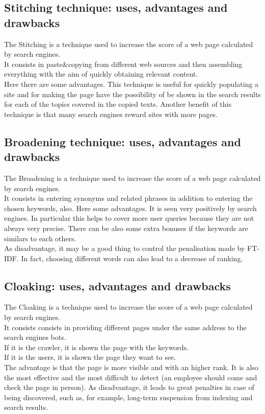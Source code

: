 \subsection{Stitching technique: uses, advantages and drawbacks}
The Stitching is a technique used to increase the score of a web page
calculated by search engines.\\ It consists in paste\&copying from
different web sources and then assembling everything with the aim
of quickly obtaining relevant content.\\
Here there are some advantages. This technique is useful for quickly
populating a site and for making the page have the possibility of be
shown in the search results for each of the topics covered in the copied
texts. Another benefit of this technique is that many search engines
reward sites with more pages.

\subsection{Broadening technique: uses, advantages and drawbacks}
The Broadening is a technique used to increase the score of a web page
calculated by search engines.\\
It consists in entering synonyms and related phrases in addition to
entering the chosen keywords, also.
Here some advantages. It is seen very
positively by search engines.
In particular this helps to cover more user queries because they are
not always very precise. There can be also some extra bonuses if the
keywords are similars to each others.\\
As disadvantage, it may be a good thing to control the penalisation made
by FT-IDF. In fact, choosing different words can also lead to a decrease of
ranking.

\subsection{Cloaking: uses, advantages and drawbacks}
The Cloaking is a technique used to increase the score of a web page
calculated by search engines.\\
It consists consists in providing different pages under the same address
to the search engines bots.\\
If it is the crawler, it is shown the page with the keywords.\\
If it is the users, it is shown the page they want to see.\\
The advantage is that the page is more visible and with an higher rank.
It is also the most effective and the most difficult to detect
(an employee should come and check the page in person).
As disadvantage, it leads to great penalties in
case of being discovered, such as, for example, long-term
suspension from indexing and search results.

